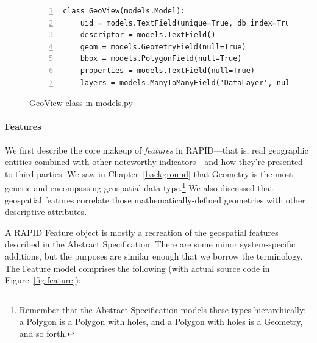 \begin{figure}[ht]
\begin{Verbatim}[samepage=true,baselinestretch=1,numbers=left,xleftmargin=12mm]
class GeoView(models.Model):
    uid = models.TextField(unique=True, db_index=True)
    descriptor = models.TextField()
    geom = models.GeometryField(null=True)
    bbox = models.PolygonField(null=True)
    properties = models.TextField(null=True)
    layers = models.ManyToManyField('DataLayer', null=True)
\end{Verbatim}
\caption{GeoView class in models.py}
\label{fig:geoview}
\end{figure}

\paragraph{Features}
We first describe the core makeup of \textit{features} in RAPID---that is, real geographic entities combined with other noteworthy indicators---and how they're presented to third parties. We saw in Chapter~\ref{background} that Geometry is the most generic and encompassing geospatial data type.\footnote{Remember that the Abstract Specification models these types hierarchically: a Polygon is a Polygon with holes, and a Polygon with holes is a Geometry, and so forth.} We also discussed that geospatial features correlate those mathematically-defined geometries with other descriptive attributes.

A RAPID Feature object is mostly a recreation of the geospatial features described in the Abstract Specification. There are some minor system-specific additions, but the purposes are similar enough that we borrow the terminology. The Feature model comprises the following (with actual source code in Figure~\ref{fig:feature}):

